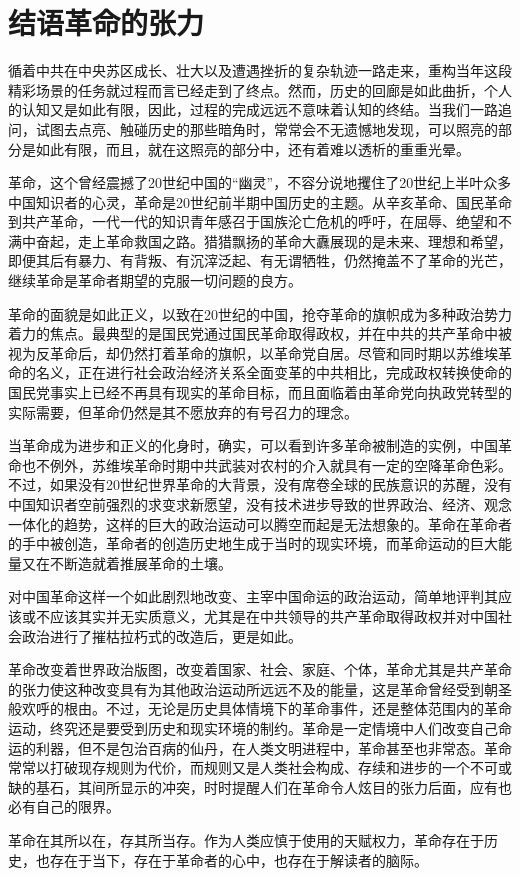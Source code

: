 \chapter*{结语\quad 革命的张力}

循着中共在中央苏区成长、壮大以及遭遇挫折的复杂轨迹一路走来，重构当年这段精彩场景的任务就过程而言已经走到了终点。然而，历史的回廊是如此曲折，个人的认知又是如此有限，因此，过程的完成远远不意味着认知的终结。当我们一路追问，试图去点亮、触碰历史的那些暗角时，常常会不无遗憾地发现，可以照亮的部分是如此有限，而且，就在这照亮的部分中，还有着难以透析的重重光晕。

革命，这个曾经震撼了20世纪中国的“幽灵”，不容分说地攫住了20世纪上半叶众多中国知识者的心灵，革命是20世纪前半期中国历史的主题。从辛亥革命、国民革命到共产革命，一代一代的知识青年感召于国族沦亡危机的呼吁，在屈辱、绝望和不满中奋起，走上革命救国之路。猎猎飘扬的革命大纛展现的是未来、理想和希望，即便其后有暴力、有背叛、有沉滓泛起、有无谓牺牲，仍然掩盖不了革命的光芒，继续革命是革命者期望的克服一切问题的良方。

革命的面貌是如此正义，以致在20世纪的中国，抢夺革命的旗帜成为多种政治势力着力的焦点。最典型的是国民党通过国民革命取得政权，并在中共的共产革命中被视为反革命后，却仍然打着革命的旗帜，以革命党自居。尽管和同时期以苏维埃革命的名义，正在进行社会政治经济关系全面变革的中共相比，完成政权转换使命的国民党事实上已经不再具有现实的革命目标，而且面临着由革命党向执政党转型的实际需要，但革命仍然是其不愿放弃的有号召力的理念。

当革命成为进步和正义的化身时，确实，可以看到许多革命被制造的实例，中国革命也不例外，苏维埃革命时期中共武装对农村的介入就具有一定的空降革命色彩。不过，如果没有20世纪世界革命的大背景，没有席卷全球的民族意识的苏醒，没有中国知识者空前强烈的求变求新愿望，没有技术进步导致的世界政治、经济、观念一体化的趋势，这样的巨大的政治运动可以腾空而起是无法想象的。革命在革命者的手中被创造，革命者的创造历史地生成于当时的现实环境，而革命运动的巨大能量又在不断造就着推展革命的土壤。

对中国革命这样一个如此剧烈地改变、主宰中国命运的政治运动，简单地评判其应该或不应该其实并无实质意义，尤其是在中共领导的共产革命取得政权并对中国社会政治进行了摧枯拉朽式的改造后，更是如此。

革命改变着世界政治版图，改变着国家、社会、家庭、个体，革命尤其是共产革命的张力使这种改变具有为其他政治运动所远远不及的能量，这是革命曾经受到朝圣般欢呼的根由。不过，无论是历史具体情境下的革命事件，还是整体范围内的革命运动，终究还是要受到历史和现实环境的制约。革命是一定情境中人们改变自己命运的利器，但不是包治百病的仙丹，在人类文明进程中，革命甚至也非常态。革命常常以打破现存规则为代价，而规则又是人类社会构成、存续和进步的一个不可或缺的基石，其间所显示的冲突，时时提醒人们在革命令人炫目的张力后面，应有也必有自己的限界。

革命在其所以在，存其所当存。作为人类应慎于使用的天赋权力，革命存在于历史，也存在于当下，存在于革命者的心中，也存在于解读者的脑际。

